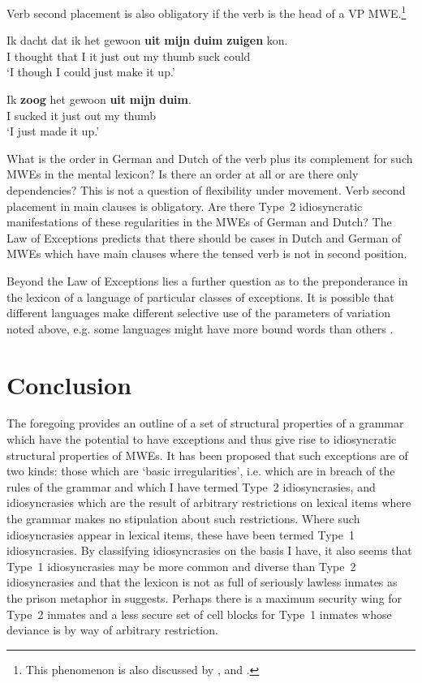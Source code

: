 \documentclass[output=paper]{langsci/langscibook}
\begin{document}
Verb second placement is also obligatory if the verb is the head of a VP MWE.\footnote{This phenomenon is also discussed by \citet{Schenk:95}, \citet{Nunberg1994} and 
.}


\ea\label{ex:ex53}
\gll Ik dacht  dat  ik het gewoon \textbf{uit}   \textbf{mijn} \textbf{duim}   \textbf{zuigen} kon.\\
  I  thought that I   it    just       out     my   thumb suck    could\\
\glt  ‘I though I could just make it up.’
\z

\ea\label{ex:ex54}
\gll Ik \textbf{zoog} het gewoon \textbf{uit}     \textbf{mijn}  \textbf{duim}.\\
  I  sucked  it    just       out      my   thumb\\
\glt  ‘I just made it up.’
\z

What is the order in German and Dutch of the verb plus its complement for such MWEs in the mental lexicon? Is there an order at all or are there only dependencies? This is not a question of flexibility under movement. Verb second placement in main clauses is obligatory. Are there Type~2 idiosyncratic manifestations of these regularities in the MWEs of German and Dutch? The Law of Exceptions predicts that there should be cases in Dutch and German of MWEs which have main clauses where the tensed verb is not in second position.

Beyond the Law of Exceptions  lies a further question as to the preponderance in the lexicon of a language of particular classes of exceptions. 
It is possible that different languages make different selective use of the parameters of variation noted above, e.g. some languages might have 
more bound words than others \citep{Dobrovolskij1988}.

\section{Conclusion}

The foregoing provides an outline of a set of structural properties of a grammar which have the potential to have exceptions and thus give rise to idiosyncratic structural properties of MWEs. It has been proposed that such exceptions are of two kinds: those which are ‘basic irregularities’, i.e. which are in breach of the rules of the grammar and which %
I have termed Type~2 idiosyncrasies, and idiosyncrasies which are the result of arbitrary restrictions on lexical items where the grammar makes no stipulation about such restrictions. Where such idiosyncrasies appear in lexical items, these have been termed Type~1 idiosyncrasies. By classifying idiosyncrasies on the basis %
I have, it also seems that Type~1 idiosyncrasies may be more common and diverse than Type~2 idiosyncrasies and that the lexicon is not as full of seriously lawless inmates as the prison metaphor in \citet{DiSciullo1987} suggests. Perhaps there is a maximum security wing for Type~2 inmates and a less secure set of cell blocks for Type~1 inmates whose deviance is by way of arbitrary restriction. 
\end{document}
